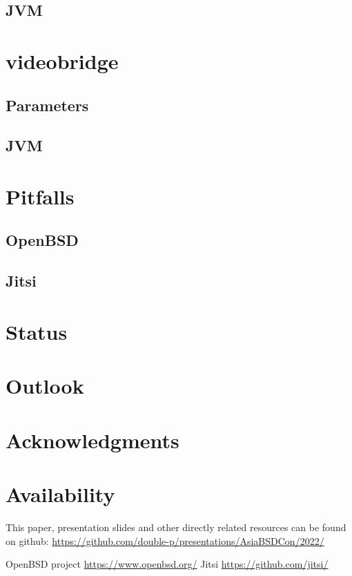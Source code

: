 \documentclass[conference]{IEEEtran}
\begin{document}
\subsection{JVM}
\section{videobridge}
\subsection{Parameters}
\subsection{JVM}
\section{Pitfalls}
\subsection{OpenBSD}
\subsection{Jitsi}
\section{Status}
\section{Outlook}
\section{Acknowledgments}







\section{Availability}
This paper, presentation slides and other directly related resources can be found on github:
\url{https://github.com/double-p/presentations/AsiaBSDCon/2022/}


\begin{thebibliography}{00}
 OpenBSD project \url{https://www.openbsd.org/}
 Jitsi \url{https://github.com/jitsi/}

\end{thebibliography}
\end{document}
